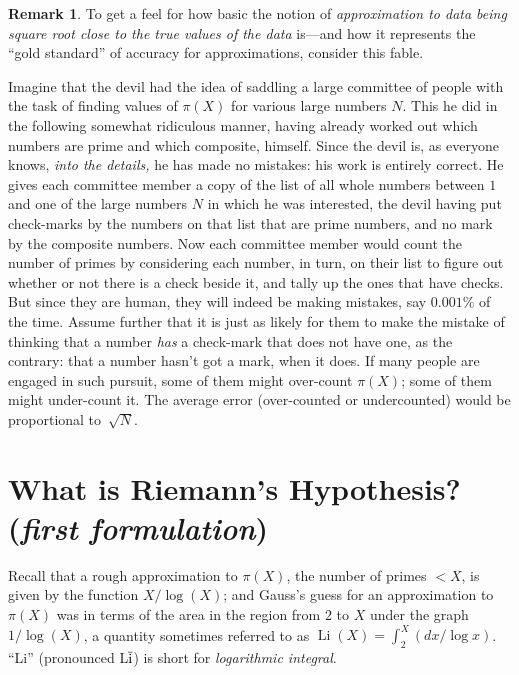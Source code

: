 \documentclass[11pt,draft]{article}
\DeclareMathOperator{\Li}{Li}
\theoremstyle{plain}
\theoremstyle{definition}
\newtheorem{remark}[theorem]{Remark}
\numberwithin{equation}{section}
\numberwithin{figure}{section}
\numberwithin{table}{section}
\begin{document}
\begin{remark}
  To get a feel for how basic the notion of {\em approximation to data
    being square root close to the true values of the data} is---and
  how it represents the ``gold standard'' of accuracy for
  approximations, consider this fable.


  Imagine that the devil had the idea of saddling a large committee of
  people with the task of finding values of $\pi(X)$ for various large
  numbers $N$.  This he did in the following somewhat ridiculous
  manner, having already worked out which numbers are prime and which
  composite, himself. Since the devil is, as everyone knows, {\em into
    the details,} he has made no mistakes: his work is entirely
  correct.  He gives each committee member a copy of the list of all
  whole numbers between $1$ and one of the large numbers $N$ in which
  he was interested, the devil having put check-marks by the numbers
  on that list that are prime numbers, and no mark by the composite
  numbers. Now each committee member would count the number of primes
  by considering each number, in turn, on their list to figure out
  whether or not there is a check beside it, and tally up the ones
  that have checks. But since they are human, they will indeed be
  making mistakes, say $0.001\%$ of the time.  Assume further that it
  is just as likely for them to make the mistake of thinking that a
  number {\em has} a check-mark that does not have one, as the
  contrary: that a number hasn't got a mark, when it does.  If many
  people are engaged in such pursuit, some of them might over-count
  $\pi(X)$; some of them might under-count it. The average error
  (over-counted or undercounted) would be proportional to~${\sqrt N}$.

\end{remark}

\section { What is Riemann's Hypothesis?  ({\em first formulation})\label{sec:rh1}}

\bigskip 

Recall that a rough approximation to $\pi(X)$, the number of primes $<
X$,  is given by the function $X/\log(X)$; and  Gauss's guess for an
approximation to $\pi(X)$  was in terms of the area in the region
from $2$ to $X$ under the graph $1/\log(X)$, a quantity sometimes referred to
as $\Li(X) = \int_2^X (dx/\log x)$.
``Li'' (pronounced L$\overline{\rm i}$) is short for {\em logarithmic integral}.
\end{document}
